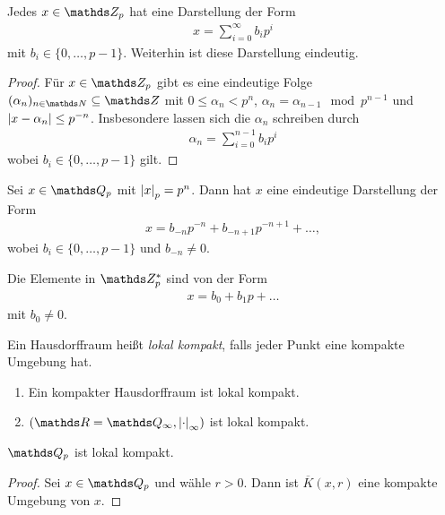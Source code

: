 \begin{prop}
Jedes $x\in \Z_p$ hat eine Darstellung der Form
\begin{align*}
x=\sum_{i=0}^\infty b_i p^i
\end{align*}
mit $b_i \in \{0,\dots,p-1\}$. Weiterhin ist diese Darstellung eindeutig.
\end{prop}
\begin{proof}
Für $x \in \Z_p$ gibt es eine eindeutige Folge $(\alpha_n)_{n\in \N}\subseteq \Z$ mit $0 \leq \alpha_n<p^n$, $\alpha_n=\alpha_{n-1} \mod p^{n-1}$ und $\left\vert x-\alpha_n\right\vert\leq p^{-n}$.
Insbesondere lassen sich die $\alpha_n$ schreiben durch
\begin{align*}
\alpha_n=\sum_{i=0}^{n-1} b_i p^i
\end{align*}
wobei $b_i \in\{0,\dots,p-1\}$ gilt.
\end{proof}

\begin{prop}
Sei $x\in \Q_p$ mit $\left\vert x\right\vert_p=p^n$. Dann hat $x$ eine eindeutige Darstellung der Form
\begin{align*}
x=b_{-n}p^{-n}+b_{-n+1}p^{-n+1}+\dots,
\end{align*}
wobei $b_i \in \{0,\dots,p-1\}$ und $b_{-n}\not =0$.
\end{prop}

\begin{bem}
Die Elemente in $\Z_p^\ast$ sind von der Form
\begin{align*}
x=b_0+b_1p+\dots
\end{align*}
mit $b_0\not =0$.
\end{bem}

\begin{defi}
Ein Hausdorffraum heißt \emph{lokal kompakt}, falls jeder Punkt eine kompakte Umgebung hat.
\end{defi}

\begin{bsp}
\begin{enumerate}[label=(\roman*)]
\item Ein kompakter Hausdorffraum ist lokal kompakt.
\item $(\R=\Q_\infty,\abs{\cdot}_\infty)$ ist lokal kompakt.
\end{enumerate}
\end{bsp}

\begin{prop}
$\Q_p$ ist lokal kompakt.
\end{prop}
\begin{proof}
Sei $x\in \Q_p$ und wähle $r>0$. Dann ist $\overline{K}(x,r)$ eine kompakte Umgebung von $x$.
\end{proof}

